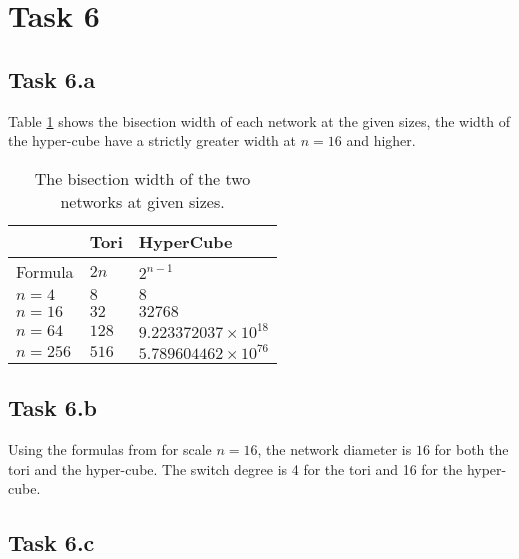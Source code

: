 \section{Task 6}

\subsection{Task 6.a}

Table \ref{tab:t6a} shows the bisection width of each network at the given
sizes, the width of the hyper-cube have a strictly greater width at $n=16$ and
higher.

\begin{table}[]
\centering
\begin{tabular}{l|ll}
        & Tori  & HyperCube                   \\ \hline
Formula & $2n$  & $2^{n-1}$                   \\
$n=4$   & $8$   & $8$                         \\
$n=16$  & $32$  & $32768$                     \\
$n=64$  & $128$ & $9.223372037\times 10^{18}$ \\
$n=256$ & $516$ & $5.789604462\times 10^{76}$
\end{tabular}
\caption{The bisection width of the two networks at given sizes.}
\label{tab:t6a}
\end{table}

\subsection{Task 6.b}


Using the formulas from \cite[slide 38]{l7Interconnect} for scale $n=16$, the
network diameter is $16$ for both the tori and the hyper-cube. The switch degree
is 4 for the tori and 16 for the hyper-cube.

\subsection{Task 6.c}
